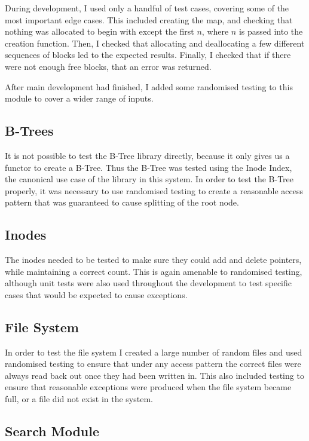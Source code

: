 \documentclass[12pt,a4paper,twoside,openright]{report}
\begin{document}
During development, I used only a handful of test cases, covering some of the most important edge cases. This included creating the map, and checking that nothing was allocated to begin with except the first $n$, where $n$ is passed into the creation function. Then, I checked that allocating and deallocating a few different sequences of blocks led to the expected results. Finally, I checked that if there were not enough free blocks, that an error was returned.

After main development had finished, I added some randomised testing to this module to cover a wider range of inputs.

\subsection{B-Trees}

It is not possible to test the B-Tree library directly, because it only gives us a functor to create a B-Tree. Thus the B-Tree was tested using the Inode Index, the canonical use case of the library in this system. In order to test the B-Tree properly, it was necessary to use randomised testing to create a reasonable access pattern that was guaranteed to cause splitting of the root node.

\subsection{Inodes}

The inodes needed to be tested to make sure they could add and delete pointers, while maintaining a correct count. This is again amenable to randomised testing, although unit tests were also used throughout the development to test specific cases that would be expected to cause exceptions.

\subsection{File System}

In order to test the file system I created a large number of random files and used randomised testing to ensure that under any access pattern the correct files were always read back out once they had been written in. This also included testing to ensure that reasonable exceptions were produced when the file system became full, or a file did not exist in the system.

\subsection{Search Module}
\end{document}
